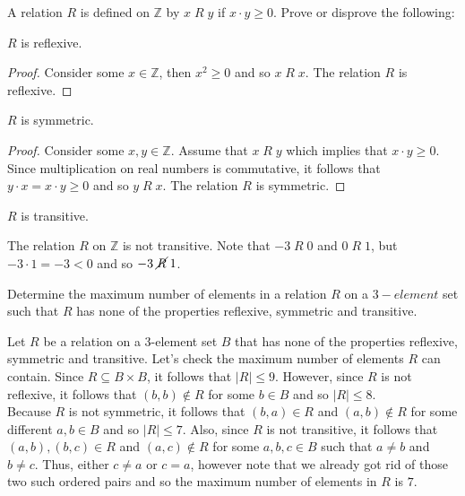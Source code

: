 \documentclass[12pt]{article}
\newcommand{\Z}{\mathbb{Z}}
\newenvironment{problem}[2][Problem]{\begin{trivlist}
		\item[\hskip \labelsep {\bfseries #1}\hskip \labelsep {\bfseries #2.}]}{\end{trivlist}}
\newenvironment{solution}[2][Solution]{\begin{trivlist}
		\item[\hskip \labelsep {\bfseries #1}\hskip \labelsep {\bfseries #2.}]}{\end{trivlist}}
\begin{document}
 	\begin{problem}{19}
 		A relation $R$ is defined on $\Z$ by $x\; R \; y$ if $x\cdot y \geq 0$. Prove or disprove the following:
 		\begin{enumerate}[label=(\alph*)]
 			\item $R$ is reflexive.
 			\begin{proof}
 				Consider some $x\in \Z$, then $x^{2} \geq 0$ and so $x \; R \; x$. The relation $R$ is reflexive.
 			\end{proof}
 			\item $R$ is symmetric.
 			\begin{proof}
 				Consider some $x,y\in \Z$. Assume that $x\; R \; y$ which implies that $x\cdot y \geq 0$. Since multiplication on real numbers is commutative, it follows that $y\cdot x = x\cdot y \geq 0$ and so $y \; R \; x$. The relation $R$ is symmetric.
 			\end{proof}
 			\item $R$ is transitive.
 			\begin{solution}{c}
 				The relation $R$ on $\Z$ is not transitive. Note that $-3 \; R \; 0$ and $0 \; R \; 1$, but $-3 \cdot 1 =-3 < 0$ and so $-3 \; \cancel R \; 1$. 
 			\end{solution}
 		\end{enumerate}
 	\end{problem}
 
 	\begin{problem}{20}
 		Determine the maximum number of elements in a relation $R$ on a $3-element$ set such that $R$ has none of the properties reflexive, symmetric and transitive.
 		\begin{solution}{20}
 			Let $R$ be a relation on a 3-element set $B$ that has none of the properties reflexive, symmetric and transitive. Let's check the maximum number of elements $R$ can contain. Since $R\subseteq B\times B$, it follows that $|R|\leq 9$. However, since $R$ is not reflexive, it follows that $(b,b)\not\in R$ for some $b\in B$ and so $|R|\leq 8$. \\
 			 
 			Because $R$ is not symmetric, it follows that $(b,a)\in R$ and $(a,b)\not\in R$ for some different $a,b\in B$ and so $|R|\leq 7$. Also, since $R$ is not transitive, it follows that $(a,b),(b,c)\in R$ and $(a,c)\not\in R$ for some $a,b,c\in B$ such that $a\neq b$ and $b\neq c$. Thus, either $c\neq a$ or $c=a$, however note that we already got rid of those two such ordered pairs and so the maximum number of elements in $R$ is $7$.
 		\end{solution}
 	\end{problem}
 
\end{document}

